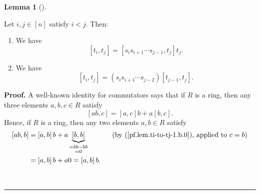 \documentclass[numbers=enddot,12pt,final,onecolumn,notitlepage]{scrartcl}%
\theoremstyle{definition}
\newtheorem{lem}[theo]{Lemma}
\newenvironment{lemma}[1][]
{\begin{lem}[#1]\begin{leftbar}}
{\end{leftbar}\end{lem}}
\newenvironment{proof}[1][Proof]{\noindent\textbf{#1.} }{\ \rule{0.5em}{0.5em}}
\begin{document}
\begin{lemma}
\label{lem.ti-to-tj-1}Let $i,j\in\left[  n\right]  $ satisfy $i<j$. Then:

\begin{enumerate}
\item[\textbf{(a)}] We have%
\[
\left[  t_{i},t_{j}\right]  =\left[  s_{i}s_{i+1}\cdots s_{j-1},t_{j}\right]
t_{j}.
\]


\item[\textbf{(b)}] We have%
\[
\left[  t_{i},t_{j}\right]  =\left(  s_{i}s_{i+1}\cdots s_{j-2}\right)
\left[  t_{j-1},t_{j}\right]  .
\]

\end{enumerate}
\end{lemma}

\begin{proof}
A well-known identity for commutators says that if $R$ is a ring, then any
three elements $a,b,c\in R$ satisfy%
\begin{equation}
\left[  ab,c\right]  =\left[  a,c\right]  b+a\left[  b,c\right]  .
\label{pf.lem.ti-to-tj-1.b.0}%
\end{equation}
Hence, if $R$ is a ring, then any two elements $a,b\in R$ satisfy%
\begin{align}
\left[  ab,b\right]   &  =\left[  a,b\right]  b+a\underbrace{\left[
b,b\right]  }_{\substack{=bb-bb\\=0}}\ \ \ \ \ \ \ \ \ \ \left(  \text{by
(\ref{pf.lem.ti-to-tj-1.b.0}), applied to }c=b\right) \nonumber\\
&  =\left[  a,b\right]  b+a0=\left[  a,b\right]  b.
\label{pf.lem.ti-to-tj-1.b.0abb}%
\end{align}



\end{proof}
\end{document}
